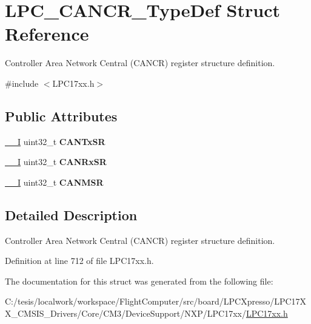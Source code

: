 \hypertarget{struct_l_p_c___c_a_n_c_r___type_def}{\section{\-L\-P\-C\-\_\-\-C\-A\-N\-C\-R\-\_\-\-Type\-Def \-Struct \-Reference}
\label{struct_l_p_c___c_a_n_c_r___type_def}
}


\-Controller \-Area \-Network \-Central (\-C\-A\-N\-C\-R) register structure definition.  




{\ttfamily \#include $<$\-L\-P\-C17xx.\-h$>$}

\subsection*{\-Public \-Attributes}
\begin{DoxyCompactItemize}
\item 
\hypertarget{struct_l_p_c___c_a_n_c_r___type_def_a8b38016c4e2b002c08b429c1c5782d74}{\hyperlink{group___c_m_s_i_s__core__definitions_gaf63697ed9952cc71e1225efe205f6cd3}{\-\_\-\-\_\-\-I} uint32\-\_\-t {\bfseries \-C\-A\-N\-Tx\-S\-R}}\label{struct_l_p_c___c_a_n_c_r___type_def_a8b38016c4e2b002c08b429c1c5782d74}

\item 
\hypertarget{struct_l_p_c___c_a_n_c_r___type_def_abd917011d5f82b5f4f14d4a5d34581b5}{\hyperlink{group___c_m_s_i_s__core__definitions_gaf63697ed9952cc71e1225efe205f6cd3}{\-\_\-\-\_\-\-I} uint32\-\_\-t {\bfseries \-C\-A\-N\-Rx\-S\-R}}\label{struct_l_p_c___c_a_n_c_r___type_def_abd917011d5f82b5f4f14d4a5d34581b5}

\item 
\hypertarget{struct_l_p_c___c_a_n_c_r___type_def_a0c84a71ed3701140f202c1864d0e8b0b}{\hyperlink{group___c_m_s_i_s__core__definitions_gaf63697ed9952cc71e1225efe205f6cd3}{\-\_\-\-\_\-\-I} uint32\-\_\-t {\bfseries \-C\-A\-N\-M\-S\-R}}\label{struct_l_p_c___c_a_n_c_r___type_def_a0c84a71ed3701140f202c1864d0e8b0b}

\end{DoxyCompactItemize}


\subsection{\-Detailed \-Description}
\-Controller \-Area \-Network \-Central (\-C\-A\-N\-C\-R) register structure definition. 

\-Definition at line 712 of file \-L\-P\-C17xx.\-h.



\-The documentation for this struct was generated from the following file\-:\begin{DoxyCompactItemize}
\item 
\-C\-:/tesis/localwork/workspace/\-Flight\-Computer/src/board/\-L\-P\-C\-Xpresso/\-L\-P\-C17\-X\-X\-\_\-\-C\-M\-S\-I\-S\-\_\-\-Drivers/\-Core/\-C\-M3/\-Device\-Support/\-N\-X\-P/\-L\-P\-C17xx/\hyperlink{_l_p_c17xx_8h}{\-L\-P\-C17xx.\-h}\end{DoxyCompactItemize}
